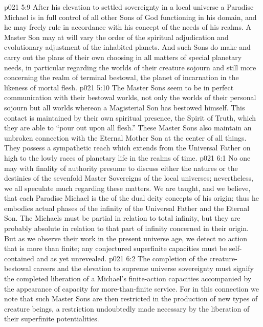 \vs p021 5:9 After his elevation to settled sovereignty in a local universe a Paradise Michael is in full control of all other Sons of God functioning in his domain, and he may freely rule in accordance with his concept of the needs of his realms. A Master Son may at will vary the order of the spiritual adjudication and evolutionary adjustment of the inhabited planets. And such Sons do make and carry out the plans of their own choosing in all matters of special planetary needs, in particular regarding the worlds of their creature sojourn and still more concerning the realm of terminal bestowal, the planet of incarnation in the likeness of mortal flesh.
\vs p021 5:10 The Master Sons seem to be in perfect communication with their bestowal worlds, not only the worlds of their personal sojourn but all worlds whereon a Magisterial Son has bestowed himself. This contact is maintained by their own spiritual presence, the Spirit of Truth, which they are able to “pour out upon all flesh.” These Master Sons also maintain an unbroken connection with the Eternal Mother Son at the center of all things. They possess a sympathetic reach which extends from the Universal Father on high to the lowly races of planetary life in the realms of time.
\vs p021 6:1 No one may with finality of authority presume to discuss either the natures or the destinies of the sevenfold Master Sovereigns of the local universes; nevertheless, we all speculate much regarding these matters. We are taught, and we believe, that each Paradise Michael is the  of the dual deity concepts of his origin; thus he embodies actual phases of the infinity of the Universal Father and the Eternal Son. The Michaels must be partial in relation to total infinity, but they are probably absolute in relation to that part of infinity concerned in their origin. But as we observe their work in the present universe age, we detect no action that is more than finite; any conjectured superfinite capacities must be self\hyp{}contained and as yet unrevealed.
\vs p021 6:2 The completion of the creature\hyp{}bestowal careers and the elevation to supreme universe sovereignty must signify the completed liberation of a Michael’s finite\hyp{}action capacities accompanied by the appearance of capacity for more\hyp{}than\hyp{}finite service. For in this connection we note that such Master Sons are then restricted in the production of new types of creature beings, a restriction undoubtedly made necessary by the liberation of their superfinite potentialities.
